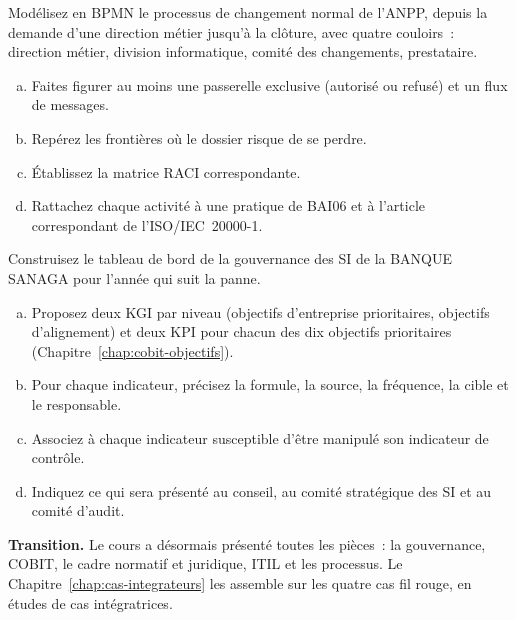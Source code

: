 \begin{boxexo}[title={\ding{45}\quad Exercice~16.2. Modéliser le processus de changement de l'ANPP \niveaumoyen}]
Modélisez en BPMN le processus de changement normal de l'ANPP, depuis la
demande d'une direction métier jusqu'à la clôture, avec quatre couloirs~:
direction métier, division informatique, comité des changements,
prestataire.
\begin{enumerate}[(a)]
    \item Faites figurer au moins une passerelle exclusive (autorisé ou
          refusé) et un flux de messages.
    \item Repérez les frontières où le dossier risque de se perdre.
    \item Établissez la matrice RACI correspondante.
    \item Rattachez chaque activité à une pratique de BAI06 et à l'article
          correspondant de l'ISO/IEC~20000-1.
\end{enumerate}
\end{boxexo}

\begin{boxexo}[title={\ding{45}\quad Exercice~16.3. Le tableau de bord de la BANQUE SANAGA \niveauexpert}]
Construisez le tableau de bord de la gouvernance des SI de la BANQUE
SANAGA pour l'année qui suit la panne.
\begin{enumerate}[(a)]
    \item Proposez deux KGI par niveau (objectifs d'entreprise prioritaires,
          objectifs d'alignement) et deux KPI pour chacun des dix objectifs
          prioritaires (Chapitre~\ref{chap:cobit-objectifs}).
    \item Pour chaque indicateur, précisez la formule, la source, la
          fréquence, la cible et le responsable.
    \item Associez à chaque indicateur susceptible d'être manipulé son
          indicateur de contrôle.
    \item Indiquez ce qui sera présenté au conseil, au comité stratégique
          des SI et au comité d'audit.
\end{enumerate}
\end{boxexo}

\bigskip

\begin{boxinfo}
\textbf{Transition.} Le cours a désormais présenté toutes les pièces~: la
gouvernance, COBIT, le cadre normatif et juridique, ITIL et les
processus. Le Chapitre~\ref{chap:cas-integrateurs} les assemble sur les
quatre cas fil rouge, en études de cas intégratrices.
\end{boxinfo}
